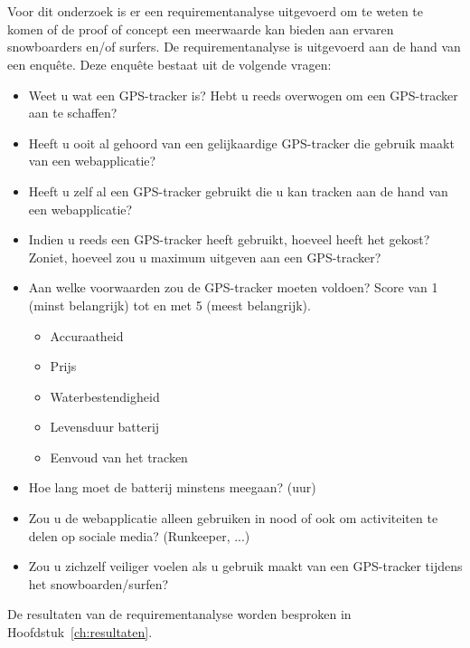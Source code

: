\section{}
\label{ch:requirementAnalyse}
Voor dit onderzoek is er een requirementanalyse uitgevoerd om te weten te komen of de proof of concept een meerwaarde kan bieden aan ervaren snowboarders en/of surfers. De requirementanalyse is uitgevoerd aan de hand van een enquête. Deze enquête bestaat uit de volgende vragen:
\begin{itemize}
	\item Weet u wat een GPS-tracker is? Hebt u reeds overwogen om een GPS-tracker aan te schaffen?
	\item Heeft u ooit al gehoord van een gelijkaardige GPS-tracker die gebruik maakt van een webapplicatie?
	\item Heeft u zelf al een GPS-tracker gebruikt die u kan tracken aan de hand van een webapplicatie?
	\item Indien u reeds een GPS-tracker heeft gebruikt, hoeveel heeft het gekost? Zoniet, hoeveel zou u maximum uitgeven aan een GPS-tracker?
	\item Aan welke voorwaarden zou de GPS-tracker moeten voldoen? Score van 1 (minst belangrijk) tot en met 5 (meest belangrijk).
	\begin{itemize}
		\item Accuraatheid
		\item Prijs
		\item Waterbestendigheid
		\item Levensduur batterij
		\item Eenvoud van het tracken
	\end{itemize}
	\item Hoe lang moet de batterij minstens meegaan? (uur)
	\item Zou u de webapplicatie alleen gebruiken in nood of ook om activiteiten te delen op sociale media? (Runkeeper, ...)
	\item Zou u zichzelf veiliger voelen als u gebruik maakt van een GPS-tracker tijdens het snowboarden/surfen?
\end{itemize}
De resultaten van de requirementanalyse worden besproken in Hoofdstuk~\ref{ch:resultaten}.


